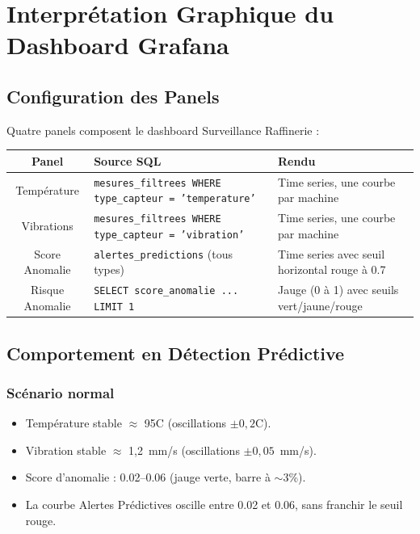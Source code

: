 \documentclass[11pt,a4paper]{article}
\begin{document}
\newpage

\section{Interprétation Graphique du Dashboard Grafana}

\subsection{Configuration des Panels}

Quatre panels composent le dashboard \og Surveillance Raffinerie \fg{} :

\begin{center}
\small
\begin{tabularx}{\textwidth}{|c|X|X|}
\hline
\textbf{Panel} & \textbf{Source SQL} & \textbf{Rendu} \\
\hline
Température & \texttt{mesures\_filtrees WHERE type\_capteur = 'temperature'} & Time series, une courbe par machine \\
Vibrations & \texttt{mesures\_filtrees WHERE type\_capteur = 'vibration'} & Time series, une courbe par machine \\
Score Anomalie & \texttt{alertes\_predictions} (tous types) & Time series avec seuil horizontal rouge à 0.7 \\
Risque Anomalie & \texttt{SELECT score\_anomalie ... LIMIT 1} & Jauge (0 à 1) avec seuils vert/jaune/rouge \\
\hline
\end{tabularx}
\end{center}

\subsection{Comportement en Détection Prédictive}

\subsubsection{Scénario normal}

\begin{itemize}
    \item Température stable $\approx$ 95\textdegree C (oscillations $\pm 0,2$\textdegree C).
    \item Vibration stable $\approx$ 1,2~mm/s (oscillations $\pm 0,05$~mm/s).
    \item Score d'anomalie : 0.02--0.06 (jauge verte, barre à $\sim$3\%).
    \item La courbe Alertes Prédictives oscille entre 0.02 et 0.06, sans franchir le seuil rouge.
\end{itemize}
\end{document}

